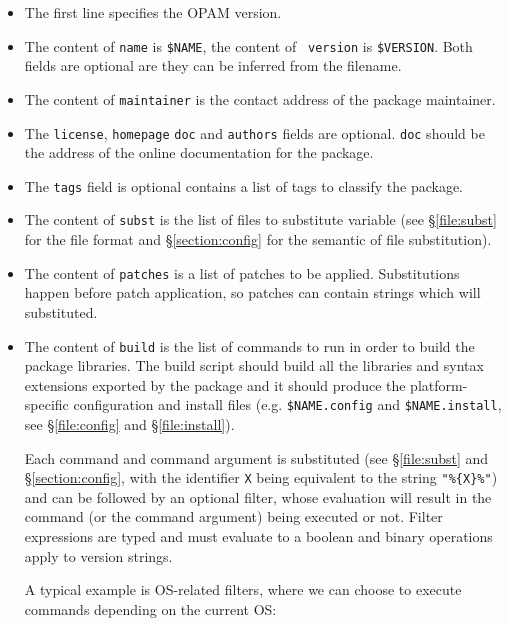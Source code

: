 \documentclass[a4paper,11pt]{article}
\begin{document}
\begin{itemize}

\item The first line specifies the OPAM version.

\item The content of {\tt name} is \verb+$NAME+, the content of {\tt
  version} is \verb+$VERSION+. Both fields are optional are they can
  be inferred from the filename.

\item The content of {\tt maintainer} is the contact address of the
  package maintainer.

\item The {\tt license}, {\tt homepage} {\tt doc} and {\tt authors}
  fields are optional. {\tt doc} should be the address of the online
  documentation for the package.

\item The {\tt tags} field is optional contains a list of tags to
  classify the package.

\item The content of {\tt subst} is the list of files to substitute
  variable (see \S\ref{file:subst} for the file format and
  \S\ref{section:config} for the semantic of file substitution).

\item The content of {\tt patches} is a list of patches to be applied.
  Substitutions happen before patch application, so patches can
  contain strings which will substituted.

\item The content of {\tt build} is the list of commands to run in
  order to build the package libraries. The build script should build
  all the libraries and syntax extensions exported by the package and
  it should produce the platform-specific configuration and install
  files (e.g. \verb+$NAME.config+ and \verb+$NAME.install+, see
  \S\ref{file:config} and \S\ref{file:install}).

   Each command and command argument is substituted (see
   \S\ref{file:subst} and \S\ref{section:config}, with the identifier
   {\tt X} being equivalent to the string {\tt "\%\{X\}\%"})
   and can be followed by an optional filter, whose evaluation will
   result in the command (or the command argument) being executed
   or not. Filter expressions are typed and must evaluate to a
   boolean and binary operations apply to version strings.

   A typical example is OS-related filters, where we can choose
   to execute commands depending on the current OS:


\end{itemize}
\end{document}
